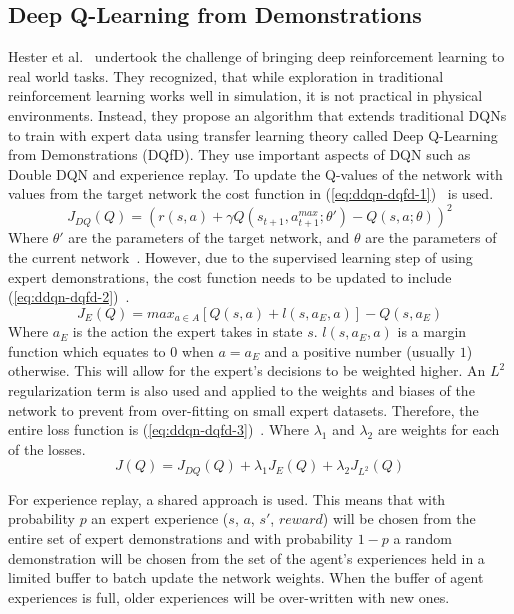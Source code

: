 \documentclass[12pt,american]{report}
\begin{document}
\subsection{Deep Q-Learning from Demonstrations}
Hester et al.~\cite{hester2017learning} undertook the challenge of bringing deep reinforcement learning to real world tasks.  They recognized, that while exploration in traditional reinforcement learning works well in simulation, it is not practical in physical environments.  Instead, they propose an algorithm that extends traditional DQNs to train with expert data using transfer learning theory called Deep Q-Learning from Demonstrations (DQfD).  They use important aspects of DQN such as Double DQN and experience replay.  To update the Q-values of the network with values from the target network the cost function in (\ref{eq:ddqn-dqfd-1})~\cite{hester2017learning} is used.
\begin{equation}
     \label{eq:ddqn-dqfd-1}
     J_{DQ}(Q) =(r(s,a)+\gamma Q(s_{t+1},a^{max}_{t+1};\theta')-Q(s,a;\theta))^2%
\end{equation}
Where $\theta'$ are the parameters of the target network, and $\theta$ are the parameters of the current network~\cite{van2016deep}.  However, due to the supervised learning step of using expert demonstrations, the cost function needs to be updated to include (\ref{eq:ddqn-dqfd-2})~\cite{hester2017learning}.
\begin{equation}
     \label{eq:ddqn-dqfd-2}
     J_{E}(Q) =max_{a\in A}[Q(s,a)+l(s,a_E,a)]-Q(s,a_E)%
\end{equation}
Where $a_E$ is the action the expert takes in state $s$.  $l(s,a_E,a)$ is a margin function which equates to $0$ when $a=a_E$ and a positive number (usually $1$) otherwise.  This will allow for the expert's decisions to be weighted higher.  An $L^2$ regularization term is also used and applied to the weights and biases of the network to prevent from over-fitting on small expert datasets.  Therefore, the entire loss function is (\ref{eq:ddqn-dqfd-3})~\cite{hester2017learning}. Where $\lambda_1$ and $\lambda_2$ are weights for each of the losses. 
\begin{equation}
     \label{eq:ddqn-dqfd-3}
     J(Q) =J_{DQ}(Q) + \lambda_1J_E(Q) + \lambda_2J_{L^2}(Q)%
\end{equation}

For experience replay, a shared approach is used.  This means that with probability $p$ an expert experience ($s$, $a$, $s'$, $reward$) will be chosen from the entire set of expert demonstrations and with probability $1-p$ a random demonstration will be chosen from the set of the agent's experiences held in a limited buffer to batch update the network weights.  When the buffer of agent experiences is full, older experiences will be over-written with new ones.  
\end{document}
